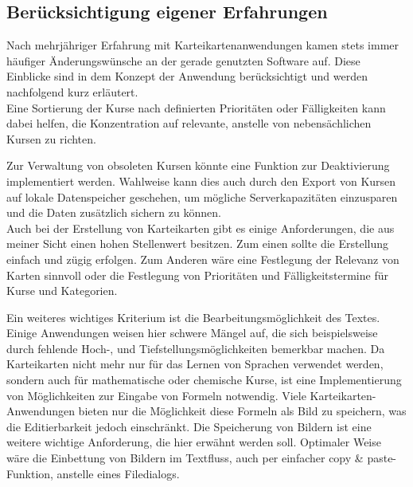 


\subsection{Berücksichtigung eigener Erfahrungen}
Nach mehrjähriger Erfahrung mit Karteikartenanwendungen kamen stets immer häufiger Änderungswünsche an der gerade genutzten Software auf. Diese Einblicke sind in dem Konzept der Anwendung berücksichtigt und werden nachfolgend kurz erläutert. \\

Eine Sortierung der Kurse nach definierten Prioritäten oder Fälligkeiten kann dabei helfen, die Konzentration auf relevante, anstelle von nebensächlichen Kursen zu richten.

Zur Verwaltung von obsoleten Kursen könnte eine Funktion zur Deaktivierung implementiert werden. Wahlweise kann dies auch durch den Export von Kursen auf lokale Datenspeicher geschehen, um mögliche Serverkapazitäten einzusparen und die Daten zusätzlich sichern zu können. \\

Auch bei der Erstellung von Karteikarten gibt es einige Anforderungen, die aus meiner Sicht einen hohen Stellenwert besitzen. Zum einen sollte die Erstellung einfach und zügig erfolgen. Zum Anderen wäre eine Festlegung der Relevanz von Karten sinnvoll oder die Festlegung von Prioritäten und Fälligkeitstermine für Kurse und Kategorien. 

Ein weiteres wichtiges Kriterium ist die Bearbeitungsmöglichkeit des Textes. Einige Anwendungen weisen hier schwere Mängel auf, die sich beispielsweise durch fehlende Hoch-, und Tiefstellungsmöglichkeiten bemerkbar machen. Da Karteikarten nicht mehr nur für das Lernen von Sprachen verwendet werden, sondern auch für mathematische oder chemische Kurse, ist eine Implementierung von Möglichkeiten zur Eingabe von Formeln notwendig. Viele Karteikarten-Anwendungen bieten nur die Möglichkeit diese Formeln als Bild zu speichern, was die Editierbarkeit jedoch einschränkt. Die Speicherung von Bildern ist eine weitere wichtige Anforderung, die hier erwähnt werden soll. Optimaler Weise wäre die Einbettung von Bildern im Textfluss, auch per einfacher copy {\&} paste-Funktion, anstelle eines Filedialogs. \\

